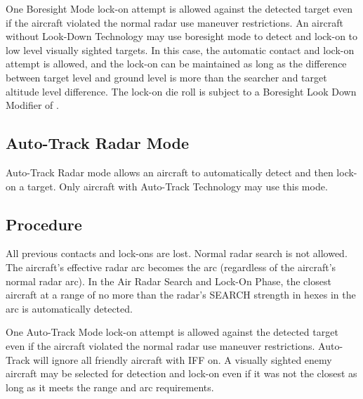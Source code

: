 \begin{advancedrules}
    One Boresight Mode lock-on attempt is allowed against the detected target even if the aircraft violated the normal radar use maneuver restrictions. An aircraft without Look-Down Technology may use boresight mode to detect and lock-on to low level visually sighted targets. In this case, the automatic contact and lock-on attempt is allowed, and the lock-on can be maintained as long as the difference between target level and ground level is more than the searcher and target altitude level difference. The lock-on die roll is subject to a Boresight Look Down Modifier of . 

    \subsection{Auto-Track Radar Mode}\label{rule:auto-track-mode} Auto-Track Radar mode allows an aircraft to automatically detect and then lock-on a target. Only aircraft with Auto-Track Technology may use this mode. 

    \subsection{Procedure}  All previous contacts and lock-ons are lost. Normal radar search is not allowed. The aircraft's effective radar arc becomes the  arc (regardless of the aircraft's normal radar arc). In the Air Radar Search and Lock-On Phase, the closest aircraft at a range of no more than the radar's SEARCH strength in hexes in the  arc is automatically detected.

    One Auto-Track Mode lock-on attempt is allowed against the detected target even if the aircraft violated the normal radar use maneuver restrictions. Auto-Track will ignore all friendly aircraft with IFF on. A visually sighted enemy aircraft may be selected for detection and lock-on  even if it was not the closest as long as it meets the range and  arc requirements. 


\end{advancedrules}
